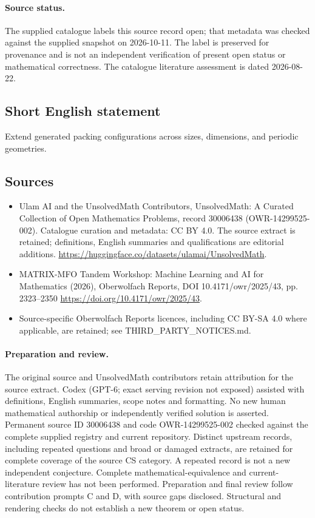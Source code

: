 \documentclass[11pt]{article}
\begin{document}
\paragraph{Source status.}
The supplied catalogue labels this source record open; that metadata was checked against the supplied snapshot on 2026-10-11. The label is preserved for provenance and is not an independent verification of present open status or mathematical correctness. The catalogue literature assessment is dated 2026-08-22.
\subsection{Short English statement}
Extend generated packing configurations across sizes, dimensions, and periodic geometries.
\subsection{Sources}
\begin{itemize}
\item[\hypertarget{source:30006438:1}{S1}] Ulam AI and the UnsolvedMath Contributors, UnsolvedMath: A Curated Collection of Open Mathematics Problems, record 30006438 (OWR-14299525-002). Catalogue curation and metadata: CC BY 4.0. The source extract is retained; definitions, English summaries and qualifications are editorial additions.
\url{https://huggingface.co/datasets/ulamai/UnsolvedMath}.
\item[\hypertarget{source:30006438:2}{S2}] MATRIX-MFO Tandem Workshop: Machine Learning and AI for Mathematics (2026), Oberwolfach Reports, DOI 10.4171/owr/2025/43, pp. 2323--2350
\url{https://doi.org/10.4171/owr/2025/43}.
\item Source-specific Oberwolfach Reports licences, including CC BY-SA 4.0 where applicable, are retained; see THIRD\_PARTY\_NOTICES.md.
\end{itemize}
\paragraph{Preparation and review.}
The original source and UnsolvedMath contributors retain attribution for the source extract. Codex (GPT-6; exact serving revision not exposed) assisted with definitions, English summaries, scope notes and formatting. No new human mathematical authorship or independently verified solution is asserted. Permanent source ID 30006438 and code OWR-14299525-002 checked against the complete supplied registry and current repository. Distinct upstream records, including repeated questions and broad or damaged extracts, are retained for complete coverage of the source CS category. A repeated record is not a new independent conjecture. Complete mathematical-equivalence and current-literature review has not been performed. Preparation and final review follow contribution prompts C and D, with source gaps disclosed. Structural and rendering checks do not establish a new theorem or open status.
\label{end:30006438}
\end{document}
